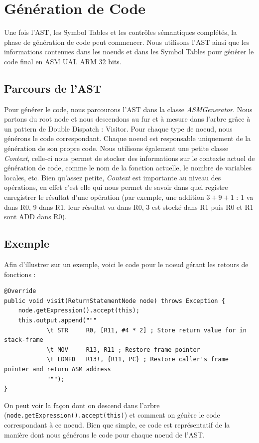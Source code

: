 \documentclass[french,a4paper]{article}
\begin{document}
    \section{Génération de Code}
    Une fois l'AST, les Symbol Tables et les contrôles sémantiques complétés, la phase de génération de code peut commencer. Nous utilisons l'AST ainsi que les informations contenues dans les noeuds et dans les Symbol Tables pour générer le code final en ASM UAL ARM 32 bits.

    \subsection{Parcours de l'AST}
    Pour générer le code, nous parcourons l'AST dans la classe \textit{ASMGenerator}. Nous partons du root node et nous descendons au fur et à mesure dans l'arbre grâce à un pattern de Double Dispatch : Visitor. Pour chaque type de noeud, nous générons le code correspondant. Chaque noeud est responsable uniquement de la génération de son propre code. Nous utilisons également une petite classe \textit{Context}, celle-ci nous permet de stocker des informations sur le contexte actuel de génération de code, comme le nom de la fonction actuelle, le nombre de variables locales, etc. Bien qu'assez petite, \textit{Context} est importante au niveau des opérations, en effet c'est elle qui nous permet de savoir dans quel registre enregistrer le résultat d'une opération (par exemple, une addition $3+9+1$ : 1 va dans R0, 9 dans R1, leur résultat va dans R0, 3 est stocké dans R1 puis R0 et R1 sont ADD dans R0). \\

    \subsection{Exemple}
    Afin d'illustrer sur un exemple, voici le code pour le noeud gérant les retours de fonctions :
    \begin{lstlisting}[label={lst:lstlisting18}]
@Override
public void visit(ReturnStatementNode node) throws Exception {
    node.getExpression().accept(this);
    this.output.append("""
            \t STR     R0, [R11, #4 * 2] ; Store return value for in stack-frame
            \t MOV     R13, R11 ; Restore frame pointer
            \t LDMFD   R13!, {R11, PC} ; Restore caller's frame pointer and return ASM address
            """);
}
    \end{lstlisting}

    On peut voir la façon dont on descend dans l'arbre (\texttt{node.getExpression().accept(this)}) et comment on génère le code correspondant à ce noeud. Bien que simple, ce code est représentatif de la manière dont nous générons le code pour chaque noeud de l'AST.
\end{document}
